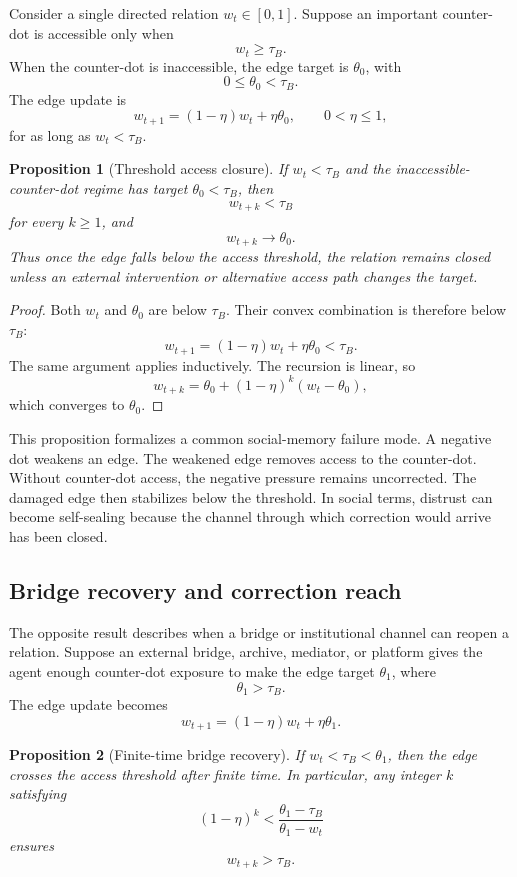 \documentclass[11pt]{article}
\newtheorem{proposition}{Proposition}
\theoremstyle{remark}
\begin{document}
Consider a single directed relation \(w_t\in[0,1]\). Suppose an important counter-dot is accessible only when
\[
w_t\geq \tau_B.
\]
When the counter-dot is inaccessible, the edge target is \(\theta_0\), with
\[
0\leq \theta_0<\tau_B.
\]
The edge update is
\[
w_{t+1}=(1-\eta)w_t+\eta\theta_0,
\qquad 0<\eta\leq 1,
\]
for as long as \(w_t<\tau_B\).

\begin{proposition}[Threshold access closure]
If \(w_t<\tau_B\) and the inaccessible-counter-dot regime has target \(\theta_0<\tau_B\), then
\[
w_{t+k}<\tau_B
\]
for every \(k\geq 1\), and
\[
w_{t+k}\to \theta_0.
\]
Thus once the edge falls below the access threshold, the relation remains closed unless an external intervention or alternative access path changes the target.
\end{proposition}

\begin{proof}
Both \(w_t\) and \(\theta_0\) are below \(\tau_B\). Their convex combination is therefore below \(\tau_B\):
\[
w_{t+1}=(1-\eta)w_t+\eta\theta_0<\tau_B.
\]
The same argument applies inductively. The recursion is linear, so
\[
w_{t+k}=\theta_0+(1-\eta)^k(w_t-\theta_0),
\]
which converges to \(\theta_0\).
\end{proof}

This proposition formalizes a common social-memory failure mode. A negative dot weakens an edge. The weakened edge removes access to the counter-dot. Without counter-dot access, the negative pressure remains uncorrected. The damaged edge then stabilizes below the threshold. In social terms, distrust can become self-sealing because the channel through which correction would arrive has been closed.

\subsection{Bridge recovery and correction reach}\label{bridge-recovery-correction-reach}

The opposite result describes when a bridge or institutional channel can reopen a relation. Suppose an external bridge, archive, mediator, or platform gives the agent enough counter-dot exposure to make the edge target \(\theta_1\), where
\[
\theta_1>\tau_B.
\]
The edge update becomes
\[
w_{t+1}=(1-\eta)w_t+\eta\theta_1.
\]

\begin{proposition}[Finite-time bridge recovery]
If \(w_t<\tau_B<\theta_1\), then the edge crosses the access threshold after finite time. In particular, any integer \(k\) satisfying
\[
(1-\eta)^k<\frac{\theta_1-\tau_B}{\theta_1-w_t}
\]
ensures
\[
w_{t+k}>\tau_B.
\]
\end{proposition}
\end{document}
